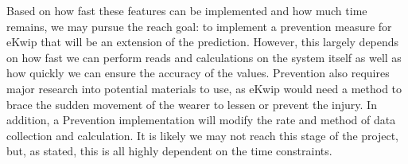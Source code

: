 Based on how fast these features can be implemented and how much time remains, we may pursue the reach goal: to implement a prevention measure for eKwip that will be an extension of the prediction. However, this largely depends on how fast we can perform reads and calculations on the system itself as well as how quickly we can ensure the accuracy of the values. Prevention also requires major research into potential materials to use, as eKwip would need a method to brace the sudden movement of the wearer to lessen or prevent the injury. In addition, a Prevention implementation will modify the rate and method of data collection and calculation. It is likely we may not reach this stage of the project, but, as stated, this is all highly dependent on the time constraints. 